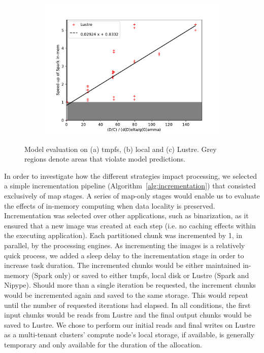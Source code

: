 \documentclass{IEEEtran}
\begin{document}
\begin{figure}
\begin{subfigure}{0.33\linewidth}
    \includegraphics[width=\textwidth]{results/figures/lustre-incrementation.pdf}
\caption{}
\label{fig:sub3}
\end{subfigure}
    \caption{Model evaluation on (a) tmpfs, (b) local and (c) Lustre. Grey 
             regions denote areas that violate model predictions.}
\label{fig:modeleval}
\end{figure}


In order to investigate how the different strategies impact processing, we 
selected a simple incrementation pipeline (Algorithm~\ref{alg:incrementation}) 
that consisted exclusively of map 
stages. A series of map-only stages would enable us to evaluate the effects of
in-memory computing when data locality is preserved. Incrementation was 
selected 
over other applications, such as binarization, as it ensured that a new image
was created at each step (i.e. no caching effects within the executing 
application). Each partitioned chunk was incremented by 1, in parallel, by
the processing engines. As incrementing the images is a relatively quick 
process, we added a sleep delay to the incrementation stage in order to 
increase task duration. The incremented chunks would be either 
maintained in-memory (Spark only) or saved to either tmpfs, local disk or 
Lustre (Spark and Nipype). Should more than a single iteration be requested, 
the increment chunks would be incremented again and saved to the same storage. 
This would repeat until the number of requested iterations had elapsed. In all 
conditions, the first input chunks would be reads from Lustre and the final 
output chunks would be saved to Lustre. We chose to perform our initial 
reads and final writes on Lustre as a multi-tenant clusters' compute node's 
local storage, if 
available, is generally temporary and only available for the duration of the 
allocation. 
\end{document}
